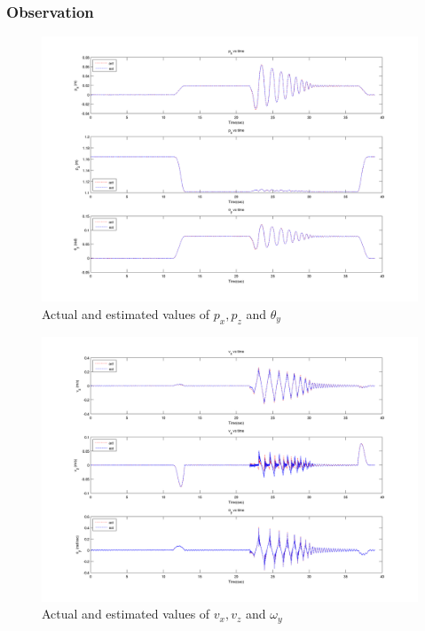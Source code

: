 \subsubsection{Observation}
\begin{figure}
    \centering
    \includegraphics[trim=25mm 10mm 25mm 10mm,clip,scale=0.55]{Bilder/plots/toro/toro_pos.png}
    \caption{Actual and estimated values of $p_x,p_z$ and $\theta_y$}
    \label{fig:toro_plotpos}
\end{figure}
\begin{figure}
    \centering
    \includegraphics[trim=25mm 10mm 25mm 10mm,clip,scale=0.55]{Bilder/plots/toro/toro_vel.png}
    \caption{Actual and estimated values of $v_x,v_z$ and $\omega_y$}
    \label{fig:toro_plotvel}
\end{figure}


